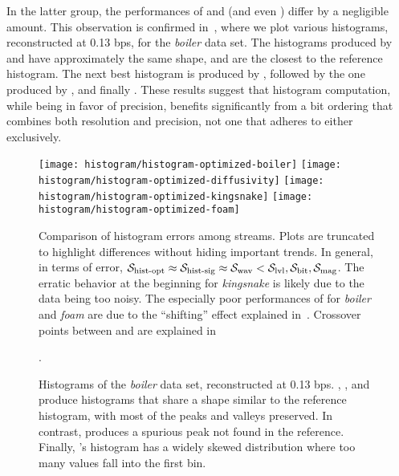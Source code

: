 In the latter group, the performances of \swav and \shsg (and even \shop) differ by a negligible
amount. This observation is confirmed in~, where we plot various
histograms, reconstructed at 0.13 bps, for the \emph{boiler} data set. The histograms produced by
\swav and \shsg have approximately the same shape, and are the closest to the reference histogram.
The next best histogram is produced by \slvl, followed by the one produced by \sbit, and finally
\smag. These results suggest that histogram computation, while being in favor of precision, benefits
significantly from a bit ordering that combines both resolution and precision, not one that adheres
to either exclusively.

\begin{figure*}[t]
	\centering
	{\texttt{[image: histogram/histogram-optimized-boiler]}}
	{\texttt{[image: histogram/histogram-optimized-diffusivity]}}
	{\texttt{[image: histogram/histogram-optimized-kingsnake]}}
	{\texttt{[image: histogram/histogram-optimized-foam]}}
	\caption{Comparison of histogram errors among streams. Plots are truncated to highlight
	differences without hiding important trends. In general, in terms of error, $\shop \approx \shsg
	\approx \swav < \slvl, \sbit, \smag$. The erratic behavior at the beginning for \emph{kingsnake}
	is likely due to the data being too noisy. The especially poor performances of \sbit for
	\emph{boiler} and \emph{foam} are due to the ``shifting'' effect explained in~.
	Crossover points between \sbit and \slvl are explained in~}.
	\label{fig:histogram-stream-comparison}
\vspace{1em}

	\centering
	\caption{Histograms of the \emph{boiler} data set, reconstructed at 0.13 bps. \slvl, \swav, and
	\shsg produce histograms that share a shape similar to the reference histogram, with most of the
	peaks and valleys preserved. In contrast, \sbit produces a spurious peak not found in the
	reference. Finally, \smag's histogram has a widely skewed distribution where too many values fall
	into the first bin.}
	\label{fig:histograms-boiler}
	\vspace{-1em}
\end{figure*}

